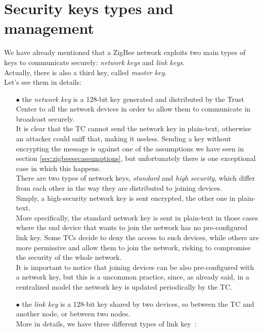 \documentclass[12pt]{report}
\begin{document}
{\section{Security keys types and management}
\label{sec:zigbeeseckeys}
\bigskip
We have already mentioned that a ZigBee network exploits two main types of keys to communicate securely: \emph{network keys} and \emph{link keys}.\\
Actually, there is also a third key, called \emph{master key}.\\
Let's see them in details:

\begin{itemize}
\setlength{\itemindent}{+4mm}
\item[$\bullet$] the \emph{network key} is a 128-bit key generated and distributed by the Trust Center to all the network devices in order to allow them to communicate in broadcast securely.\\
It is clear that the TC cannot send the network key in plain-text, otherwise an attacker could sniff that, making it useless. Sending a key without encrypting the message is against one of the assumptions we have seen in section \ref{sec:zigbeesecassumptions}, but unfortunately there is one exceptional case in which this happens.\\

There are two types of network keys, \emph{standard} and \emph{high security}, which differ from each other in the way they are distributed to joining devices. \\
Simply, a high-security network key is sent encrypted, the other one in plain-text.\\
More specifically, the standard network key is sent in plain-text in those cases where the end device that wants to join the network has no pre-configured link key. Some TCs decide to deny the access to such devices, while others are more permissive and allow them to join the network, risking to compromise the security of the whole network.\\

It is important to notice that joining devices can be also pre-configured with a network key, but this is a uncommon practice, since, as already said,  in a centralized model the network key is updated periodically by the TC.
\item[$\bullet$] the \emph{link key} is a 128-bit key shared by two devices, so between the TC and another node, or between two nodes.\\
More in details, we have three different types of link key~\cite{secanalysisofzigbee}:


\end{itemize}}
\end{document}
